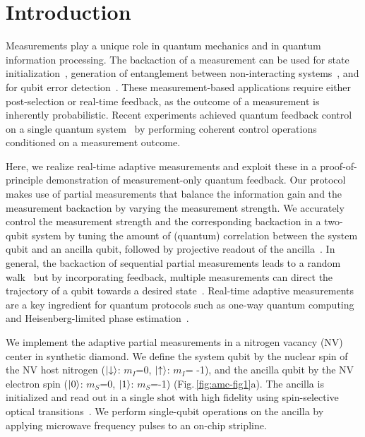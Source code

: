 \clearpage

\section{Introduction}
Measurements play a unique role in quantum mechanics and in quantum information processing. The backaction of a measurement can be used for state initialization~\cite{Robledo_Nature_2011,Riste_PRL_2012}, generation of entanglement between non-interacting systems~\cite{Chou_Nature_2005,Moehring_Nature_2007,Pfaff_NatPhys_2012,Riste_Nature_2013}, and for qubit error detection~\cite{Chiaverini_Nature_2004}. These measurement-based applications require either post-selection or real-time feedback, as the outcome of a measurement is inherently probabilistic. Recent experiments achieved quantum feedback control on a single quantum system~\cite{Riste_Nature_2013, Gillett_PRL_2010,Sayrin_Nature_2011,Vijay_Nature_2012} by performing coherent control operations conditioned on a measurement outcome.

Here, we realize real-time adaptive measurements and exploit these in a proof-of-principle demonstration of measurement-only quantum feedback. Our protocol makes use of partial measurements that balance the information gain and the measurement backaction by varying the measurement strength. We accurately control the measurement strength and the corresponding backaction in a two-qubit system by tuning the amount of (quantum) correlation between the system qubit and an ancilla qubit, followed by projective readout of the ancilla~\cite{Brun_PhysRevA_2008,Groen_PRL_2013}. In general, the backaction of sequential partial measurements leads to a random walk~\cite{Guerlin_Nature_2007,Hatridge_Science_2013,Murch_Nature_2013} but by incorporating feedback, multiple measurements can direct the trajectory of a qubit towards a desired state~\cite{Ashhab_PhysRevA_2010,Wiseman_NatureNV_2011}. Real-time adaptive measurements are a key ingredient for quantum protocols such as one-way quantum computing~\cite{Raussendorf_PRL_2001,Prevedel_Nature_2007} and Heisenberg-limited phase estimation~\cite{Cappellaro_PhysRevA_2012,Higgins_Nature_2007}.

We implement the adaptive partial measurements in a nitrogen vacancy (NV) center in synthetic diamond. We define the system qubit by the nuclear spin of the NV host nitrogen ($\left|\downarrow\right>$: $m_I$=0, $\left|\uparrow\right>$: $m_I$= -1), and the ancilla qubit by the NV electron spin ($\left|0\right>$: $m_S$=0, $\left|1\right>$: $m_S$=-1) (Fig.\,\ref{fig:amc-fig1}a). The ancilla is initialized and read out in a single shot with high fidelity using spin-selective optical transitions~\cite{Robledo_Nature_2011}. We perform single-qubit operations on the ancilla by applying microwave frequency pulses to an on-chip stripline.


